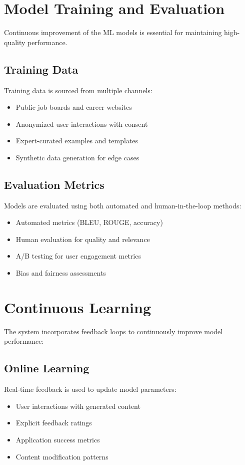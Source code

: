 \documentclass[12pt,a4paper]{report}
\begin{document}
\section{Model Training and Evaluation}
Continuous improvement of the ML models is essential for maintaining high-quality performance.

\subsection{Training Data}
Training data is sourced from multiple channels:
\begin{itemize}[leftmargin=2em]
  \item Public job boards and career websites
  \item Anonymized user interactions with consent
  \item Expert-curated examples and templates
  \item Synthetic data generation for edge cases
\end{itemize}

\subsection{Evaluation Metrics}
Models are evaluated using both automated and human-in-the-loop methods:
\begin{itemize}[leftmargin=2em]
  \item Automated metrics (BLEU, ROUGE, accuracy)
  \item Human evaluation for quality and relevance
  \item A/B testing for user engagement metrics
  \item Bias and fairness assessments
\end{itemize}

\section{Continuous Learning}
The system incorporates feedback loops to continuously improve model performance:

\subsection{Online Learning}
Real-time feedback is used to update model parameters:
\begin{itemize}[leftmargin=2em]
  \item User interactions with generated content
  \item Explicit feedback ratings
  \item Application success metrics
  \item Content modification patterns
\end{itemize}
\end{document}
